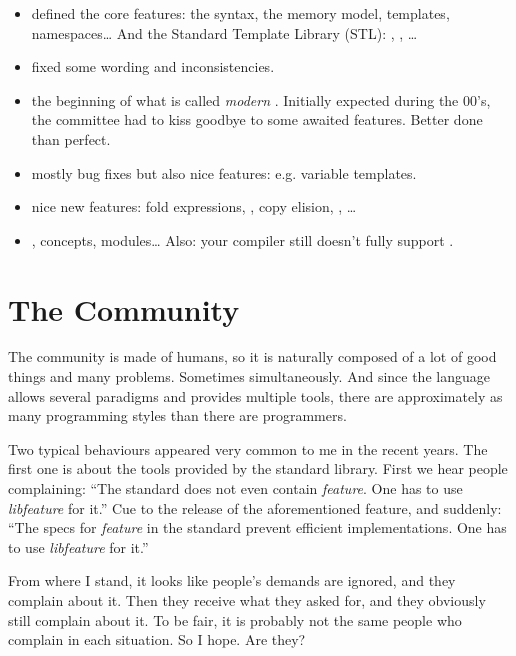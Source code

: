 \begin{itemize}
\item {\bf {}} defined the core features: the syntax, the memory
  model, templates, namespaces… And the Standard Template Library
  (STL): , , …
\item {\bf {}} fixed some wording and inconsistencies.
\item {\bf {}} the beginning of what is called \emph{modern
  \cpp}. Initially expected during the 00's, the committee had to kiss
  goodbye to some awaited features. Better done than perfect.
\item {\bf {}} mostly bug fixes but also nice features:
  e.g. variable templates.
\item {\bf {}} nice new features: fold expressions, , copy elision, , …
\item {\bf {}} , concepts, modules… Also: your
  compiler still doesn't fully support .
\end{itemize}

\section{The Community}

The \cpp{} community is made of humans, so it is naturally composed of
a lot of good things and many problems. Sometimes simultaneously. And
since the language allows several paradigms and provides multiple
tools, there are approximately as many programming styles than there
are \cpp{} programmers.

Two typical behaviours appeared very common to me in the recent
years. The first one is about the tools provided by the standard
library. First we hear people complaining: ``The standard does not
even contain {\em feature}. One has to use {\em libfeature} for it.''
Cue to the release of the aforementioned feature, and suddenly: ``The
specs for {\em feature} in the standard prevent efficient
implementations. One has to use {\em libfeature} for it.''

From where I stand, it looks like people's demands are ignored, and
they complain about it. Then they receive what they asked for, and
they obviously still complain about it. To be fair, it is probably not
the same people who complain in each situation. So I hope. Are they?

